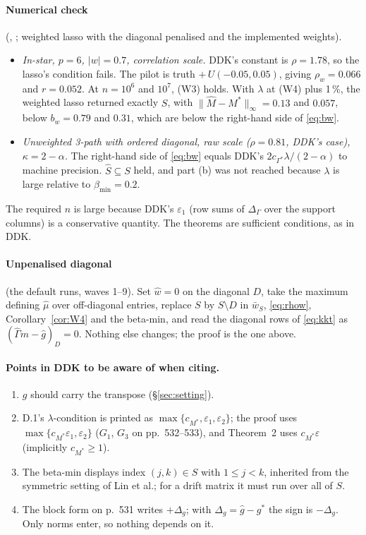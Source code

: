 \documentclass[11pt,a4paper]{article}
\numberwithin{equation}{section}
\theoremstyle{plain}
\theoremstyle{remark}
\begin{document}
\paragraph{Numerical check} (, ; weighted lasso with the diagonal penalised and the implemented weights).
\begin{itemize}
  \item \emph{In-star, $p=6$, $|w|=0.7$, correlation scale.} DDK's constant is $\rho=1.78$, so the lasso's condition fails. The pilot is truth $+\,U(-0.05,0.05)$, giving $\rho_w=0.066$ and $r=0.052$. At $n=10^6$ and $10^7$, (W3) holds. With $\lambda$ at (W4) plus 1\,\%, the weighted lasso returned exactly $S$, with $\|\hat M-M^*\|_\infty=0.13$ and $0.057$, below $b_w=0.79$ and $0.31$, which are below the right-hand side of \eqref{eq:bw}.
  \item \emph{Unweighted 3-path with ordered diagonal, raw scale ($\rho=0.81$, DDK's case), $\kappa=2-\alpha$.} The right-hand side of \eqref{eq:bw} equals DDK's $2c_{\Gamma^*}\lambda/(2-\alpha)$ to machine precision. $\hat S\subseteq S$ held, and part (b) was not reached because $\lambda$ is large relative to $\beta_{\min}=0.2$.
\end{itemize}
The required $n$ is large because DDK's $\varepsilon_1$ (row sums of $\Delta_\Gamma$ over the support columns) is a conservative quantity. The theorems are sufficient conditions, as in DDK.

\paragraph{Unpenalised diagonal} (the default runs, waves 1--9). Set $\hat w=0$ on the diagonal $D$, take the maximum defining $\hat\mu$ over off-diagonal entries, replace $S$ by $S\setminus D$ in $\bar w_S$, \eqref{eq:rhow}, Corollary~\ref{cor:W4} and the beta-min, and read the diagonal rows of \eqref{eq:kkt} as $(\hat\Gamma\hat m-\hat g)_D=0$. Nothing else changes; the proof is the one above.

\paragraph{Points in DDK to be aware of when citing.}
\begin{enumerate}
  \item $g$ should carry the transpose (\S\ref{sec:setting}).
  \item D.1's $\lambda$-condition is printed as $\max\{c_{M^*},\varepsilon_1,\varepsilon_2\}$; the proof uses $\max\{c_{M^*}\varepsilon_1,\varepsilon_2\}$ ($G_1$, $G_3$ on pp.~532--533), and Theorem~2 uses $c_{M^*}\varepsilon$ (implicitly $c_{M^*}\ge1$).
  \item The beta-min displays index $(j,k)\in S$ with $1\le j<k$, inherited from the symmetric setting of Lin et al.; for a drift matrix it must run over all of $S$.
  \item The block form on p.~531 writes $+\Delta_g$; with $\Delta_g=\hat g-g^*$ the sign is $-\Delta_g$. Only norms enter, so nothing depends on it.
\end{enumerate}
\end{document}

